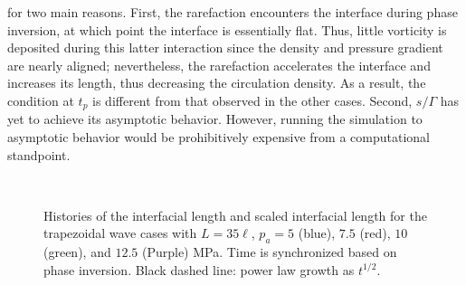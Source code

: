 for two main reasons. First, the rarefaction encounters the interface
during phase inversion, at which point the interface is essentially
flat.  Thus, little vorticity is deposited during this latter
interaction since the density and pressure gradient are nearly
aligned; nevertheless, the rarefaction accelerates the interface and
increases its length, thus decreasing the circulation density. As a
result, the condition at $t_p$ is different from that observed in the
other cases.  Second, $s/\Gamma$ has yet to achieve its asymptotic
behavior.  However, running the simulation to asymptotic behavior
would be prohibitively expensive from a computational standpoint.%
%
\begin{figure}
  \centering
  \begin{subfigure}{0.45\textwidth}
     \label{fig:trapz_scp_t1000_unscaled}
   \end{subfigure}
   ~~~
   \begin{subfigure}{0.45\textwidth}
     \label{fig:trapz_scp_t1000_scaled} 
  \end{subfigure}
  \caption[The interface length at long times]{Histories of the
    interfacial length  and
    scaled interfacial length  for
    the trapezoidal wave cases with $L=35\ell$, $p_a = 5$ (blue), $7.5$
    (red), $10$ (green), and $12.5$ (Purple) MPa. Time is synchronized
    based on phase inversion. Black dashed line: power law growth as
    $t^{1/2}$.}
  \label{fig:trapz_scp_t1000}
\end{figure}
% 



